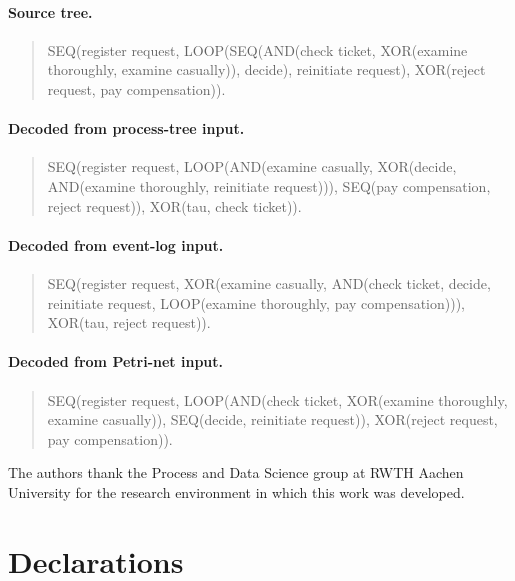 \documentclass[pdflatex,sn-basic]{sn-jnl}
\begin{document}
\paragraph{Source tree.}
\begin{quote}\ttfamily\small\raggedright
SEQ(register request, LOOP(SEQ(AND(check ticket,
XOR(examine thoroughly, examine casually)), decide),
reinitiate request), XOR(reject request, pay compensation)).
\end{quote}

\paragraph{Decoded from process-tree input.}
\begin{quote}\ttfamily\small\raggedright
SEQ(register request, LOOP(AND(examine casually,
XOR(decide, AND(examine thoroughly, reinitiate request))),
SEQ(pay compensation, reject request)), XOR(tau, check ticket)).
\end{quote}

\paragraph{Decoded from event-log input.}
\begin{quote}\ttfamily\small\raggedright
SEQ(register request, XOR(examine casually,
AND(check ticket, decide, reinitiate request,
LOOP(examine thoroughly, pay compensation))),
XOR(tau, reject request)).
\end{quote}

\paragraph{Decoded from Petri-net input.}
\begin{quote}\ttfamily\small\raggedright
SEQ(register request, LOOP(AND(check ticket,
XOR(examine thoroughly, examine casually)),
SEQ(decide, reinitiate request)),
XOR(reject request, pay compensation)).
\end{quote}

\FloatBarrier


The authors thank the Process and Data Science group at RWTH Aachen University for the research environment in which this work was developed.

\section*{Declarations}
\end{document}
